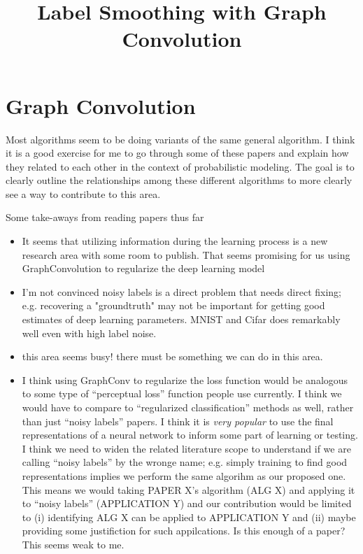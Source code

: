 \documentclass[11pt]{article}
\title{Label Smoothing with Graph Convolution}
\author{}
\date{}
\begin{document}
\maketitle

\section{Graph Convolution}

Most algorithms seem to be doing variants of the same general algorithm. I think it is a good exercise for me to go through some of these papers and explain how they related to each other in the context of probabilistic modeling. The goal is to clearly outline the relationships among these different algorithms to more clearly see a way to contribute to this area.

% 

\vspace{2cm}
\noindent Some take-aways from reading papers thus far
\begin{itemize}
\item It seems that utilizing information during the learning process is a new research area with some room to publish. That seems promising for us using GraphConvolution to regularize the deep learning model
\item I'm not convinced noisy labels is a direct problem that needs direct fixing; e.g. recovering a "groundtruth" may not be important for getting good estimates of deep learning parameters. MNIST and Cifar does remarkably well even with high label noise.
\item this area seems busy! there must be something we can do in this area.
\item I think using GraphConv to regularize the loss function would be analogous to some type of ``perceptual loss'' function people use currently. I think we would have to compare to ``regularized classification'' methods as well, rather than just ``noisy labels'' papers. I think it is \emph{very popular} to use the final representations of a neural network to inform some part of learning or testing. I think we need to widen the related literature scope to understand if we are calling ``noisy labels'' by the wronge name; e.g. simply training to find good representations implies we perform the same algorihm as our proposed one. This means we would taking PAPER X's algorithm (ALG X) and applying it to ``noisy labels'' (APPLICATION Y) and our contribution would be limited to (i) identifying ALG X can be applied to APPLICATION Y and (ii) maybe providing some justifiction for such appilcations. Is this enough of a paper? This seems weak to me.
\end{itemize}
\end{document}
